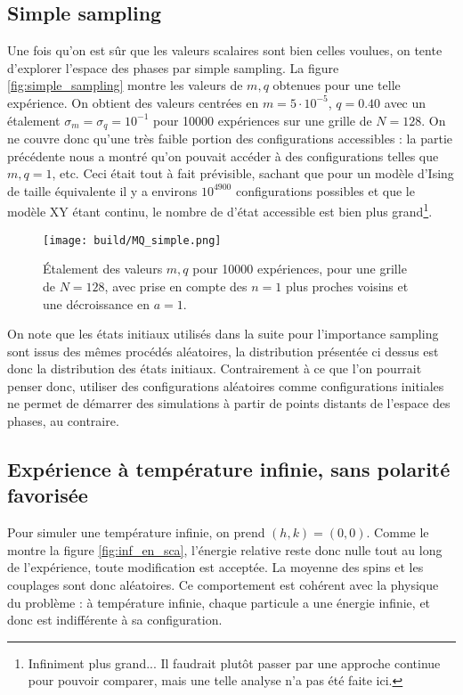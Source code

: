 \documentclass[a4paper, 11pt]{article}
\begin{document}
\subsection{Simple sampling}

Une fois qu'on est sûr que les valeurs scalaires sont bien celles voulues, on tente d'explorer
l'espace des phases par simple sampling. La figure \ref{fig:simple_sampling} montre les valeurs de
$m, q$ obtenues pour une telle expérience. On obtient des valeurs centrées en $m=5\cdot10^{-5}$,
$q=0.40$ avec un étalement $\sigma_m = \sigma_q = 10^{-1}$ pour 10000 expériences sur une grille de
$N=128$. On ne couvre donc qu'une très faible portion des configurations accessibles : la partie
précédente nous a montré qu'on pouvait accéder à des configurations telles que $m, q = 1$, etc. Ceci
était tout à fait prévisible, sachant que pour un modèle d'Ising de taille équivalente il y a
environs $10^{4900}$ configurations possibles et que le modèle XY étant continu, le nombre de d'état
accessible est bien plus grand\footnote{Infiniment plus grand... Il faudrait plutôt passer par une
approche continue pour pouvoir comparer, mais une telle analyse n'a pas été faite ici.}.

\begin{figure}  
    \centering
    \texttt{[image: build/MQ\_simple.png]}
    \caption{Étalement des valeurs $m, q$ pour 10000 expériences, pour une grille de
    $N=128$, avec prise en compte des $n=1$ plus proches voisins et une décroissance en $a=1$.}
\end{figure}

On note que les états initiaux utilisés dans la suite pour l'importance sampling sont issus des
mêmes procédés aléatoires, la distribution présentée ci dessus est donc la distribution des états
initiaux. Contrairement à ce que l'on pourrait penser donc, utiliser des configurations aléatoires
comme configurations initiales ne permet de démarrer des simulations à partir de points distants de
l'espace des phases, au contraire. 

\subsection{Expérience à température infinie, sans polarité favorisée}

Pour simuler une température infinie, on prend $(h, k) = (0, 0)$. Comme le montre la figure
\ref{fig:inf_en_sca}, l'énergie relative reste donc nulle tout au long de l'expérience, toute
modification est acceptée. La moyenne des spins et les couplages sont donc aléatoires. Ce
comportement est cohérent avec la physique du problème : à température infinie, chaque particule a
une énergie infinie, et donc est indifférente à sa configuration. 
\end{document}
